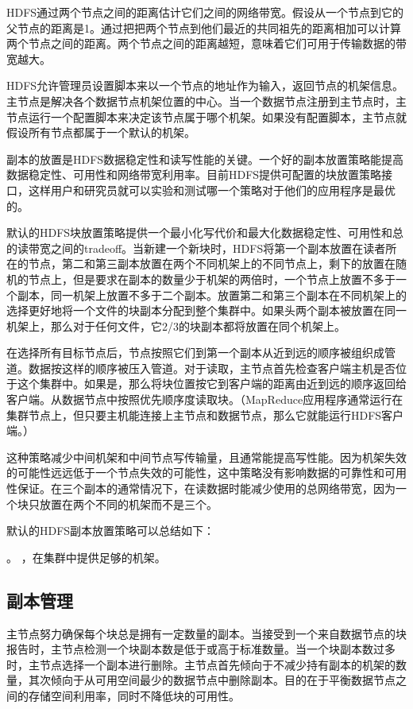 HDFS通过两个节点之间的距离估计它们之间的网络带宽。假设从一个节点到它的父节点的距离是1。通过把把两个节点到他们最近的共同祖先的距离相加可以计算两个节点之间的距离。两个节点之间的距离越短，意味着它们可用于传输数据的带宽越大。

HDFS允许管理员设置脚本来以一个节点的地址作为输入，返回节点的机架信息。主节点是解决各个数据节点机架位置的中心。当一个数据节点注册到主节点时，主节点运行一个配置脚本来决定该节点属于哪个机架。如果没有配置脚本，主节点就假设所有节点都属于一个默认的机架。

副本的放置是HDFS数据稳定性和读写性能的关键。一个好的副本放置策略能提高数据稳定性、可用性和网络带宽利用率。目前HDFS提供可配置的块放置策略接口，这样用户和研究员就可以实验和测试哪一个策略对于他们的应用程序是最优的。

默认的HDFS块放置策略提供一个最小化写代价和最大化数据稳定性、可用性和总的读带宽之间的tradeoff。当新建一个新块时，HDFS将第一个副本放置在读者所在的节点，第二和第三副本放置在两个不同机架上的不同节点上，剩下的放置在随机的节点上，但是要求在副本的数量少于机架的两倍时，一个节点上放置不多于一个副本，同一机架上放置不多于二个副本。放置第二和第三个副本在不同机架上的选择更好地将一个文件的块副本分配到整个集群中。如果头两个副本被放置在同一机架上，那么对于任何文件，它2/3的块副本都将放置在同个机架上。

在选择所有目标节点后，节点按照它们到第一个副本从近到远的顺序被组织成管道。数据按这样的顺序被压入管道。对于读取，主节点首先检查客户端主机是否位于这个集群中。如果是，那么将块位置按它到客户端的距离由近到远的顺序返回给客户端。从数据节点中按照优先顺序度读取块。（MapReduce应用程序通常运行在集群节点上，但只要主机能连接上主节点和数据节点，那么它就能运行HDFS客户端。）

这种策略减少中间机架和中间节点写传输量，且通常能提高写性能。因为机架失效的可能性远远低于一个节点失效的可能性，这中策略没有影响数据的可靠性和可用性保证。在三个副本的通常情况下，在读数据时能减少使用的总网络带宽，因为一个块只放置在两个不同的机架而不是三个。

默认的HDFS副本放置策略可以总结如下：
\begin{itemize}
。
，在集群中提供足够的机架。
\end{itemize}
\subsection{副本管理}

主节点努力确保每个块总是拥有一定数量的副本。当接受到一个来自数据节点的块报告时，主节点检测一个块副本数是低于或高于标准数量。当一个块副本数过多时，主节点选择一个副本进行删除。主节点首先倾向于不减少持有副本的机架的数量，其次倾向于从可用空间最少的数据节点中删除副本。目的在于平衡数据节点之间的存储空间利用率，同时不降低块的可用性。

